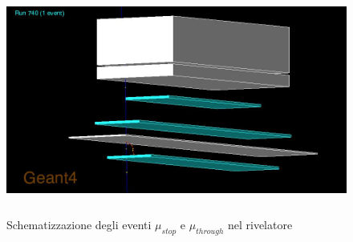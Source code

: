 \documentclass{standalone}
\begin{document}
\begin{figure}[H]
	\centering
  \includegraphics[width=13cm, height=7.5cm]{images/mu_stop.jpg}
	\caption{Schematizzazione degli eventi $\mu_{stop}$ e $\mu_{through}$ nel rivelatore}
\end{figure}
\end{document}
